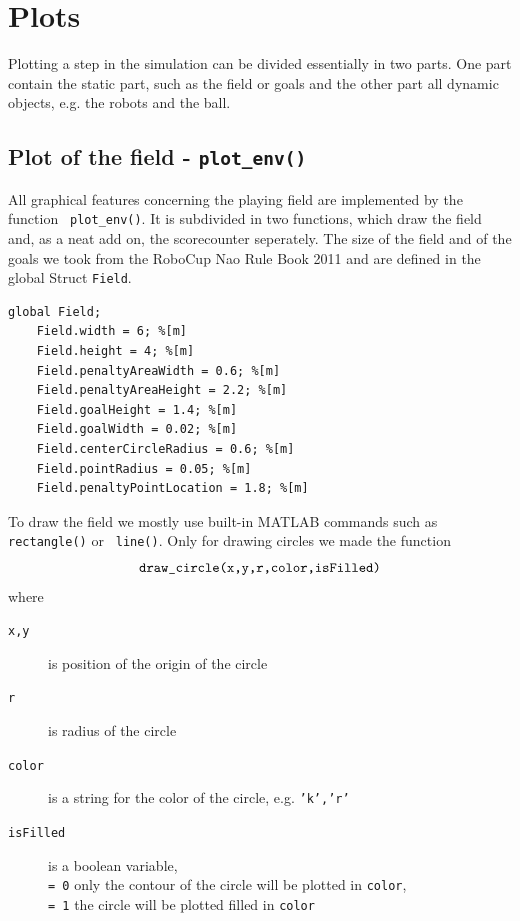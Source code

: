 \section{Plots}
Plotting a step in the simulation can be divided essentially in two parts. One part contain the static part, such as the field or goals and the other part all dynamic objects, e.g. the robots and the ball.

\subsection*{Plot of the field - \texttt{plot\_env()} }
All graphical features concerning the playing field are implemented by the function \texttt{ plot\_env()}. It is subdivided in two functions, which draw the field and, as a neat add on, the scorecounter seperately. The size of the field and of the goals we took from the RoboCup Nao Rule Book 2011 and are defined in the global Struct \texttt{Field}.
\begin{lstlisting}
global Field;
    Field.width = 6; %[m]
    Field.height = 4; %[m]
    Field.penaltyAreaWidth = 0.6; %[m]
    Field.penaltyAreaHeight = 2.2; %[m]
    Field.goalHeight = 1.4; %[m]
    Field.goalWidth = 0.02; %[m]
    Field.centerCircleRadius = 0.6; %[m]
    Field.pointRadius = 0.05; %[m]
    Field.penaltyPointLocation = 1.8; %[m]
\end{lstlisting}
\vspace{+10pt}

To draw the field we mostly use built-in MATLAB commands such as \texttt{ rectangle()} or \texttt{ line()}. Only for drawing circles we made the function
	\[ \textnormal{\texttt{draw\_circle(x,y,r,color,isFilled)}}
	\]
where
\begin{description}
	\item[\texttt{x,y}] is position of the origin of the circle
	\item[\texttt{r}] is radius of the circle
	\item[\texttt{color}] is a string for the color of the circle, e.g. \texttt{'k','r'}
	\item[\texttt{isFilled}] is a boolean variable,\\
	\texttt{= 0} only the contour of the circle will be plotted in \texttt{color},\\
	\texttt{= 1} the circle will be plotted filled in \texttt{color}
\end{description}


